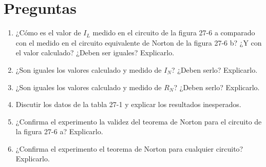 \section{Preguntas}
\begin{enumerate}[label=\arabic*.]
    \item ¿Cómo es el valor de $I_L$ medido en el circuito de la figura 27-6 a comparado con el medido en el circuito equivalente de Norton de la figura 27-6 b? ¿Y con el valor calculado? ¿Deben ser iguales? Explicarlo.

    \item ¿Son iguales los valores calculado y medido de $I_N$? ¿Deben serlo? Explicarlo.

    \item ¿Son iguales los valores calculado y medido de $R_N$? ¿Deben serlo? Explicarlo.

    \item Discutir los datos de la tabla 27-1 y explicar los resultados inesperados.

    \item ¿Confirma el experimento la validez del teorema de Norton para el circuito de la figura 27-6 a? Explicarlo.

    \item ¿Confirma el experimento el teorema de Norton para cualquier circuito? Explicarlo.
\end{enumerate}